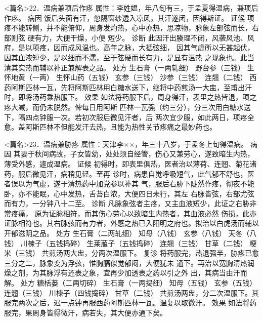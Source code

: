 \documentclass[a4paper,12pt,UTF8,twoside]{ctexbook}
\begin{document}
<篇名>22．温病兼项后作疼
属性：李姓媪，年八旬有三，于孟夏得温病，兼项后作疼。 
病因 饭后头面有汗，忽隔窗纱透入凉风，其汗遂闭，因得斯证。 
证候 项疼不能转侧，并不能俯仰，周身发灼热，心中亦热，思凉物，脉象左部弦而长，右部则弦 
硬有力，大便干燥，小便 
短少。 
诊断 此因汗出腠理不闭，风袭风池、风府，是以项疼，因而成风温也。高年之脉，大抵弦细， 
因其气虚所以无甚起伏，因其血液短少，是以细而不濡，至于弦硬而长有力，是显有温热 
之现象也。此当清其实热而辅以补正兼解表之品。 
处方 生石膏（一两轧细） 野台参（三钱） 生怀地黄（一两） 生怀山药（五钱） 
玄参（三钱） 沙参（三钱） 连翘（二钱） 
西药阿斯匹林一瓦，先将阿斯匹林用白糖水送下，继将中药煎汤一大盅，至甫出汗时，即将汤药乘热服下。 
效果 如法将药服下后，周身得汗，表里之热皆退，项之疼大减，而仍未脱然。俾每日用阿斯 
匹林一瓦强（约三分），分三次用白糖水送下，隔四点钟服一次。若初次服后微见汗者，后 
两次宜少服，如此两日，项疼全愈。盖阿斯匹林不但能发汗去热，且能为热性关节疼痛之最妙药也。 


<篇名>23．温病兼胁疼
属性：天津李××，年三十八岁，于孟冬上旬得温病。 
病因 其妻于秋间病故，子女皆幼，处处须自经管，伤心又兼劳心，遂致暗生内热，薄受外感，遽成温病。 
证候 初得时，即表里俱热，医者治以薄荷、连翘、菊花诸药，服后微见汗，病稍见轻。至再 
诊时，病患自觉呼吸短气，此气郁不舒也，医者误以为气虚，遂于清热药中加党参以补其 
气，服后右胁下陡然作疼，彻夜不能卧，亦不能眠，心中发热，舌苔白浓，大便四日未行，其左 
右脉皆弦，右部尤弦而有力，一分钟八十二至。 
诊断 凡脉象弦者主疼，又主血液短少，此证之右胁非常疼痛， 
原为证脉相符，而其伤心劳心以致暗生内热者，其血液必然 
伤损，此亦证脉相符也。其右脉弦而有力者，外感之热已入阳明之府也。拟治以白虎汤而辅以开郁滋阴之品。 
处方 生石膏（二两轧细） 知母（八钱） 玄参（八钱） 天冬（八钱） 
川楝子（五钱捣碎） 生莱菔子（五钱捣碎） 连翘（三钱） 甘草（二钱） 粳米（三钱） 
共煎汤两大盅，分两次温服下。 
复诊 将药服完，热退强半，胁疼已愈三分之二，脉象变为浮弦，惟胸膈似觉郁闷，大便犹未 
通下。再治以宽胸清热润燥之剂，为其脉浮有还表之象，宜再少加透表之药以引之外 
出，其病当由汗而解。 
处方 糖栝蒌（二两切碎） 生石膏（一两捣细） 知母（五钱） 玄参（五钱） 
连翘（三钱） 川楝子（四钱捣碎） 甘草（二钱） 
共煎汤两盅，分二次温服下。其服完两次之后，迟一点钟再服西药阿斯匹林一瓦。温复以取微汗。 
效果 如法将药服完，果周身皆得微汗，病若失，其大便亦通下矣。 
\end{document}
